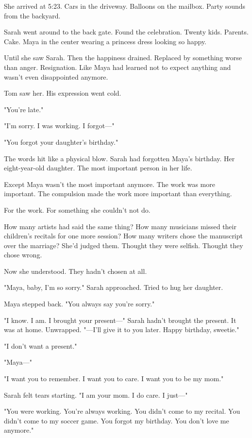 She arrived at 5:23. Cars in the driveway. Balloons on the mailbox. Party sounds from the backyard.

Sarah went around to the back gate. Found the celebration. Twenty kids. Parents. Cake. Maya in the center wearing a princess dress looking so happy.

Until she saw Sarah. Then the happiness drained. Replaced by something worse than anger. Resignation. Like Maya had learned not to expect anything and wasn't even disappointed anymore.

Tom saw her. His expression went cold.

"You're late."

"I'm sorry. I was working. I forgot—"

"You forgot your daughter's birthday."

The words hit like a physical blow. Sarah had forgotten Maya's birthday. Her eight-year-old daughter. The most important person in her life.

Except Maya wasn't the most important anymore. The work was more important. The compulsion made the work more important than everything.

For the work. For something she couldn't not do.

How many artists had said the same thing? How many musicians missed their children's recitals for one more session? How many writers chose the manuscript over the marriage? She'd judged them. Thought they were selfish. Thought they chose wrong.

Now she understood. They hadn't chosen at all.

"Maya, baby, I'm so sorry." Sarah approached. Tried to hug her daughter.

Maya stepped back. "You always say you're sorry."

"I know. I am. I brought your present—" Sarah hadn't brought the present. It was at home. Unwrapped. "—I'll give it to you later. Happy birthday, sweetie."

"I don't want a present."

"Maya—"

"I want you to remember. I want you to care. I want you to be my mom."

Sarah felt tears starting. "I am your mom. I do care. I just—"

"You were working. You're always working. You didn't come to my recital. You didn't come to my soccer game. You forgot my birthday. You don't love me anymore."

